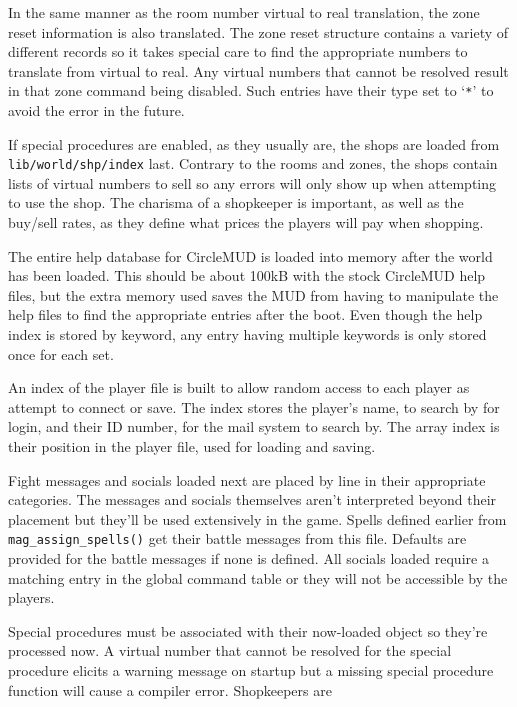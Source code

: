 \documentclass[11pt]{article}
\begin{document}
\par
In the same manner as the room number virtual to real translation, the zone reset information is also translated.  The zone reset structure contains a variety of different records so it takes special care to find the appropriate numbers to translate from virtual to real.  Any virtual numbers that cannot be resolved result in that zone command being disabled. Such entries have their type set to `\texttt{*}' to avoid the error in the future.
\par
If special procedures are enabled, as they usually are, the shops are loaded from \texttt{lib/world/shp/index} last.  Contrary to the rooms and zones, the shops contain lists of virtual numbers to sell so any errors will only show up when attempting to use the shop.  The charisma of a shopkeeper is important, as well as the buy/sell rates, as they define what prices the players will pay when shopping.
\par
The entire help database for CircleMUD is loaded into memory after the world has been loaded.  This should be about 100kB with the stock CircleMUD help files, but the extra memory used saves the MUD from having to manipulate the help files to find the appropriate entries after the boot.  Even though the help index is stored by keyword, any entry having multiple keywords is only stored once for each set.
\par
An index of the player file is built to allow random access to each player as attempt to connect or save.  The index stores the player's name, to search by for login, and their ID number, for the mail system to search by.  The array index is their position in the player file, used for loading and saving.
\par
Fight messages and socials loaded next are placed by line in their appropriate categories.  The messages and socials themselves aren't interpreted beyond their placement but they'll be used extensively in the game.  Spells defined earlier from \texttt{mag\_assign\_spells()} get their battle
messages from this file. Defaults are provided for the battle messages if none is defined.  All socials loaded require a matching entry in the global command table or they will not be accessible by the players.
\par
Special procedures must be associated with their now-loaded object so they're processed now.  A virtual number that cannot be resolved for the special procedure elicits a warning message on startup but a missing special procedure function will cause a compiler error.  Shopkeepers are
\end{document}
